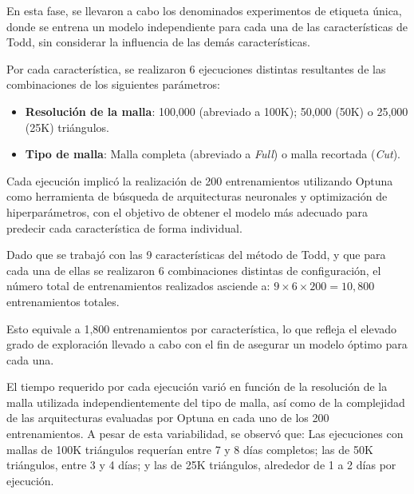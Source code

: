En esta fase, se llevaron a cabo los denominados experimentos de etiqueta única, donde se entrena un modelo independiente para cada una de las características de Todd, sin considerar la influencia de las demás características.

Por cada característica, se realizaron 6 ejecuciones distintas resultantes de las combinaciones de los siguientes parámetros:

\begin{itemize}
\item \textbf{Resolución de la malla}: 100,000 (abreviado a 100K); 50,000 (50K) o 25,000 (25K) triángulos.
\item \textbf{Tipo de malla}: Malla completa (abreviado a \textit{Full}) o malla recortada (\textit{Cut}).
\end{itemize}

Cada ejecución implicó la realización de 200 entrenamientos utilizando Optuna como herramienta de búsqueda de arquitecturas neuronales y optimización de hiperparámetros, con el objetivo de obtener el modelo más adecuado para predecir cada característica de forma individual.

Dado que se trabajó con las 9 características del método de Todd, y que para cada una de ellas se realizaron 6 combinaciones distintas de configuración, el número total de entrenamientos realizados asciende a: $9\times6\times200=10,800$ entrenamientos totales.

Esto equivale a 1,800 entrenamientos por característica, lo que refleja el elevado grado de exploración llevado a cabo con el fin de asegurar un modelo óptimo para cada una.

El tiempo requerido por cada ejecución varió en función de la resolución de la malla utilizada independientemente del tipo de malla, así como de la complejidad de las arquitecturas evaluadas por Optuna en cada uno de los 200 entrenamientos. A pesar de esta variabilidad, se observó que: Las ejecuciones con mallas de 100K triángulos requerían entre 7 y 8 días completos; las de 50K triángulos, entre 3 y 4 días; y las de 25K triángulos, alrededor de 1 a 2 días por ejecución.

